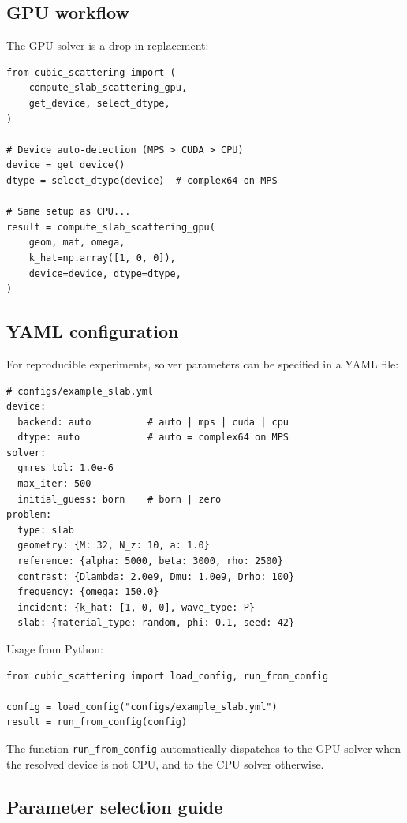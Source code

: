 \documentclass[11pt,a4paper]{article}
\begin{document}
\subsection{GPU workflow}

The GPU solver is a drop-in replacement:

\begin{verbatim}
from cubic_scattering import (
    compute_slab_scattering_gpu,
    get_device, select_dtype,
)

# Device auto-detection (MPS > CUDA > CPU)
device = get_device()
dtype = select_dtype(device)  # complex64 on MPS

# Same setup as CPU...
result = compute_slab_scattering_gpu(
    geom, mat, omega,
    k_hat=np.array([1, 0, 0]),
    device=device, dtype=dtype,
)
\end{verbatim}

\subsection{YAML configuration}

For reproducible experiments, solver parameters can be specified
in a YAML file:

\begin{verbatim}
# configs/example_slab.yml
device:
  backend: auto          # auto | mps | cuda | cpu
  dtype: auto            # auto = complex64 on MPS
solver:
  gmres_tol: 1.0e-6
  max_iter: 500
  initial_guess: born    # born | zero
problem:
  type: slab
  geometry: {M: 32, N_z: 10, a: 1.0}
  reference: {alpha: 5000, beta: 3000, rho: 2500}
  contrast: {Dlambda: 2.0e9, Dmu: 1.0e9, Drho: 100}
  frequency: {omega: 150.0}
  incident: {k_hat: [1, 0, 0], wave_type: P}
  slab: {material_type: random, phi: 0.1, seed: 42}
\end{verbatim}

\noindent
Usage from Python:

\begin{verbatim}
from cubic_scattering import load_config, run_from_config

config = load_config("configs/example_slab.yml")
result = run_from_config(config)
\end{verbatim}

The function \texttt{run\_from\_config} automatically dispatches
to the GPU solver when the resolved device is not CPU, and to
the CPU solver otherwise.

\subsection{Parameter selection guide}
\end{document}
